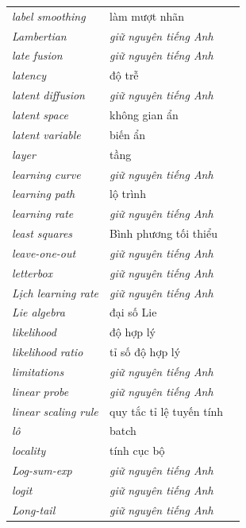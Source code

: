 \documentclass[deep_learning.tex]{subfiles}
\begin{document}
\begin{longtable}{@{}L{5.2cm}L{5.9cm}L{2.6cm}@{}}
\emph{label smoothing} & làm mượt nhãn & \\
\emph{Lambertian} & \emph{\color{tiercol}giữ nguyên tiếng Anh} & \\
\emph{late fusion} & \emph{\color{tiercol}giữ nguyên tiếng Anh} & \\
\emph{latency} & độ trễ & \\
\emph{latent diffusion} & \emph{\color{tiercol}giữ nguyên tiếng Anh} & \\
\emph{latent space} & không gian ẩn & \\
\emph{latent variable} & biến ẩn & \\
\emph{layer} & tầng & \\
\emph{learning curve} & \emph{\color{tiercol}giữ nguyên tiếng Anh} & \\
\emph{learning path} & lộ trình & \\
\emph{learning rate} & \emph{\color{tiercol}giữ nguyên tiếng Anh} & \\
\emph{least squares} & Bình phương tối thiểu & \\
\emph{leave-one-out} & \emph{\color{tiercol}giữ nguyên tiếng Anh} & \\
\emph{letterbox} & \emph{\color{tiercol}giữ nguyên tiếng Anh} & \\
\emph{Lịch learning rate} & \emph{\color{tiercol}giữ nguyên tiếng Anh} & \\
\emph{Lie algebra} & đại số Lie & \\
\emph{likelihood} & độ hợp lý & \\
\emph{likelihood ratio} & tỉ số độ hợp lý & \\
\emph{limitations} & \emph{\color{tiercol}giữ nguyên tiếng Anh} & \\
\emph{linear probe} & \emph{\color{tiercol}giữ nguyên tiếng Anh} & \\
\emph{linear scaling rule} & quy tắc tỉ lệ tuyến tính & \\
\emph{lô} & batch & \\
\emph{locality} & tính cục bộ & \\
\emph{Log-sum-exp} & \emph{\color{tiercol}giữ nguyên tiếng Anh} & \\
\emph{logit} & \emph{\color{tiercol}giữ nguyên tiếng Anh} & \\
\emph{Long-tail} & \emph{\color{tiercol}giữ nguyên tiếng Anh} & \\

\end{longtable}
\end{document}
